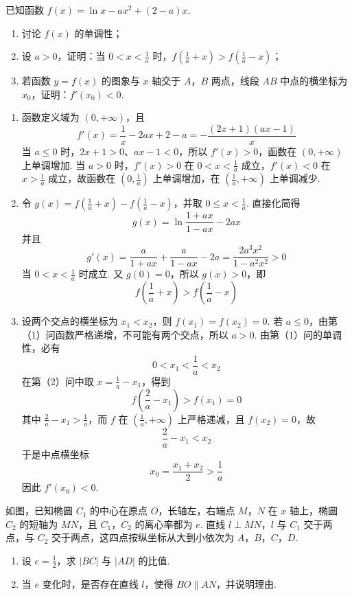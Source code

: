 \begin{problem}
已知函数 \( f(x) = \ln x - ax^2 + (2 - a)x \).
\begin{enumerate}
\item 讨论 \(f(x)\) 的单调性；
\item 设 \(a > 0\)，证明：当 \(0 < x < \frac{1}{a}\) 时，\(f\left(\frac{1}{a} + x\right) > f\left(\frac{1}{a} - x\right)\)；
\item 若函数 \( y = f(x) \) 的图象与 \( x \) 轴交于 \(A\)，\(B\) 两点，线段 \(AB\) 中点的横坐标为 \( x_0 \)，证明：\( f'(x_0) < 0 \).
\end{enumerate}
\end{problem}

\begin{solution}
\begin{enumerate}
\item 函数定义域为 \((0,+\infty)\)，且
\[
f'(x)=\frac1x-2ax+2-a
= -\frac{(2x+1)(ax-1)}{x}
\]
当 \(a\leqslant0\) 时，\(2x+1>0\)、\(ax-1<0\)，所以 \(f'(x)>0\)，函数在 \((0,+\infty)\) 上单调增加. 当 \(a>0\) 时，\(f'(x)>0\) 在 \(0<x<\frac{1}{a}\) 成立，\(f'(x)<0\) 在 \(x>\frac{1}{a}\) 成立，故函数在 \((0,\frac{1}{a})\) 上单调增加，在 \((\frac{1}{a},+\infty)\) 上单调减少.
\item 令 \(g(x)=f\left(\frac1a+x\right)-f\left(\frac1a-x\right)\)，并取 \(0\leqslant x<\frac1a\).
直接化简得
\[
g(x)=\ln\frac{1+ax}{1-ax}-2ax
\]
并且
\[
g'(x)=\frac{a}{1+ax}+\frac{a}{1-ax}-2a
=\frac{2a^{3}x^{2}}{1-a^{2}x^{2}}>0
\]
当 \(0<x<\frac{1}{a}\) 时成立. 又 \(g(0)=0\)，所以 \(g(x)>0\)，即
\[
f\left(\frac1a+x\right)>f\left(\frac1a-x\right)
\]
\item 设两个交点的横坐标为 \(x_{1}<x_{2}\)，则 \(f(x_{1})=f(x_{2})=0\). 若 \(a\leqslant0\)，由第（1）问函数严格递增，不可能有两个交点，所以 \(a>0\). 由第（1）问的单调性，必有
\[
0<x_{1}<\frac1a<x_{2}
\]
在第（2）问中取 \(x=\frac1a-x_{1}\)，得到
\[
f\left(\frac2a-x_{1}\right)>f(x_{1})=0
\]
其中 \(\frac2a-x_{1}>\frac1a\)，而 \(f\) 在 \((\frac{1}{a},+\infty)\) 上严格递减，且 \(f(x_{2})=0\)，故
\[
\frac2a-x_{1}<x_{2}
\]
于是中点横坐标
\[
x_{0}=\frac{x_{1}+x_{2}}2>\frac1a
\]
因此 \(f'(x_{0})<0\).
\end{enumerate}
\end{solution}

\begin{problem}
如图，已知椭圆 \(C_1\) 的中心在原点 \(O\)，长轴左，右端点 \(M\)，\(N\) 在 \(x\) 轴上，椭圆 \(C_2\) 的短轴为 \(MN\)，且 \(C_1\)，\(C_2\) 的离心率都为 \(e\). 直线 \(l \perp MN\)，\(l\) 与 \(C_1\) 交于两点，与 \(C_2\) 交于两点，这四点按纵坐标从大到小依次为 \(A\)，\(B\)，\(C\)，\(D\).
\begin{enumerate}
\item 设 \(e = \frac{1}{2}\)，求 \(|BC|\) 与 \(|AD|\) 的比值.
\item 当 \(e\) 变化时，是否存在直线 \(l\)，使得 \(BO \parallel AN\)，并说明理由.
\end{enumerate}

\end{problem}

